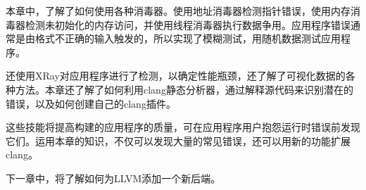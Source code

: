 
本章中，了解了如何使用各种消毒器。使用地址消毒器检测指针错误，使用内存消毒器检测未初始化的内存访问，并使用线程消毒器执行数据争用。应用程序错误通常是由格式不正确的输入触发的，所以实现了模糊测试，用随机数据测试应用程序。

还使用XRay对应用程序进行了检测，以确定性能瓶颈，还了解了可视化数据的各种方法。本章还了解了如何利用clang静态分析器，通过解释源代码来识别潜在的错误，以及如何创建自己的clang插件。

这些技能将提高构建的应用程序的质量，可在应用程序用户抱怨运行时错误前发现它们。运用本章的知识，不仅可以发现大量的常见错误，还可以用新的功能扩展clang。

下一章中，将了解如何为LLVM添加一个新后端。




























